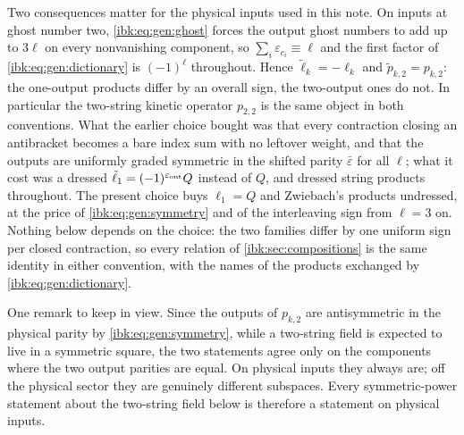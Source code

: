 Two consequences matter for the physical inputs used in this note. On inputs at ghost number two, \eqref{ibk:eq:gen:ghost} forces the output ghost numbers to add up to $3\ell$ on every nonvanishing component, so $\sum_i\varepsilon_{c_i}\equiv\ell$ and the first factor of \eqref{ibk:eq:gen:dictionary} is $(-1)^\ell$ throughout. Hence $\tilde\ell_k=-\ell_k$ and $\tilde p_{k,2}=p_{k,2}$: the one-output products differ by an overall sign, the two-output ones do not. In particular the two-string kinetic operator $p_{2,2}$ is the same object in both conventions. What the earlier choice bought was that every contraction closing an antibracket becomes a bare index sum with no leftover weight, and that the outputs are uniformly graded symmetric in the shifted parity $\bar\varepsilon$ for all $\ell$; what it cost was a dressed $\tilde\ell_1=(-1)^{\varepsilon_{\rm out}}Q$ instead of $Q$, and dressed string products throughout. The present choice buys $\ell_1=Q$ and Zwiebach's products undressed, at the price of \eqref{ibk:eq:gen:symmetry} and of the interleaving sign from $\ell=3$ on. Nothing below depends on the choice: the two families differ by one uniform sign per closed contraction, so every relation of \cref{ibk:sec:compositions} is the same identity in either convention, with the names of the products exchanged by \eqref{ibk:eq:gen:dictionary}.

One remark to keep in view. Since the outputs of $p_{k,2}$ are antisymmetric in the physical parity by \eqref{ibk:eq:gen:symmetry}, while a two-string field is expected to live in a symmetric square, the two statements agree only on the components where the two output parities are equal. On physical inputs they always are; off the physical sector they are genuinely different subspaces. Every symmetric-power statement about the two-string field below is therefore a statement on physical inputs.

